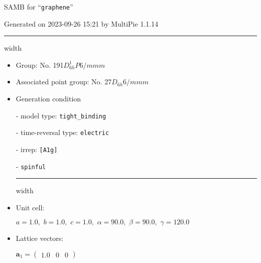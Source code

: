 \documentclass[fleqn,10pt,landscape]{article}
\begin{document}
\setcounter{MaxMatrixCols}{16}

\setlength{\baselineskip}{16pt}
\footnotesize
\begin{center}
\LARGE
SAMB for ``\texttt{graphene}''
\end{center}
\begin{flushright}
Generated on 2023-09-26 15:21 by MultiPie 1.1.14
\end{flushright}
\vspace{1cm}


 \hfil \hrule height 1mm width \textwidth \hfil

\begin{itemize}
\item Group: No. 191\quad$D_{6h}^{1}$\quad$P6/mmm$\quad[ hexagonal ]

\item Associated point group: No. 27\quad$D_{6h}$\quad$6/mmm$\quad[ hexagonal ]

\vspace{5mm}

\item Generation condition

\quad - model type: \texttt{tight_binding}

\quad - time-reversal type: \texttt{electric}

\quad - irrep: \texttt{[A1g]}

\quad - \texttt{spinful}


 \hfil \hrule height 1mm width \textwidth \hfil

\item Unit cell:

\quad $a=1.0,\,\, b=1.0,\,\, c=1.0,\,\, \alpha=90.0,\,\, \beta=90.0,\,\, \gamma=120.0$

\item Lattice vectors:

\quad $\bm{a}_1=\begin{pmatrix} 1.0 & 0 & 0 \end{pmatrix}$


\end{itemize}
\end{document}
